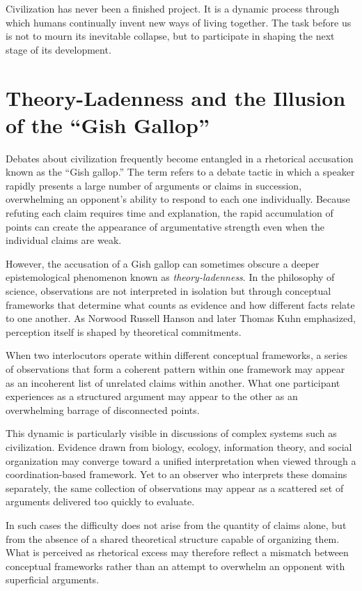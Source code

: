 \documentclass[12pt]{article}
\begin{document}
Civilization has never been a finished project. It is a dynamic process through which humans continually invent new ways of living together. The task before us is not to mourn its inevitable collapse, but to participate in shaping the next stage of its development.

\section{Theory-Ladenness and the Illusion of the ``Gish Gallop''}

Debates about civilization frequently become entangled in a rhetorical accusation known as the ``Gish gallop.'' The term refers to a debate tactic in which a speaker rapidly presents a large number of arguments or claims in succession, overwhelming an opponent's ability to respond to each one individually. Because refuting each claim requires time and explanation, the rapid accumulation of points can create the appearance of argumentative strength even when the individual claims are weak.

However, the accusation of a Gish gallop can sometimes obscure a deeper epistemological phenomenon known as \emph{theory-ladenness}. In the philosophy of science, observations are not interpreted in isolation but through conceptual frameworks that determine what counts as evidence and how different facts relate to one another. As Norwood Russell Hanson and later Thomas Kuhn emphasized, perception itself is shaped by theoretical commitments.

When two interlocutors operate within different conceptual frameworks, a series of observations that form a coherent pattern within one framework may appear as an incoherent list of unrelated claims within another. What one participant experiences as a structured argument may appear to the other as an overwhelming barrage of disconnected points.

This dynamic is particularly visible in discussions of complex systems such as civilization. Evidence drawn from biology, ecology, information theory, and social organization may converge toward a unified interpretation when viewed through a coordination-based framework. Yet to an observer who interprets these domains separately, the same collection of observations may appear as a scattered set of arguments delivered too quickly to evaluate.

In such cases the difficulty does not arise from the quantity of claims alone, but from the absence of a shared theoretical structure capable of organizing them. What is perceived as rhetorical excess may therefore reflect a mismatch between conceptual frameworks rather than an attempt to overwhelm an opponent with superficial arguments.
\end{document}
